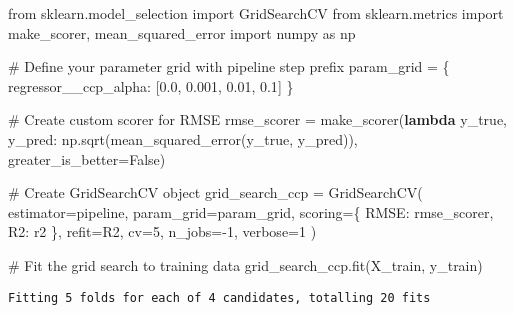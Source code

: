 \documentclass[
  letterpaper,
  DIV=11,
  numbers=noendperiod]{scrreprt}
\newenvironment{Shaded}{\begin{snugshade}}{\end{snugshade}}
\newcommand{\CommentTok}[1]{\textcolor[rgb]{0.37,0.37,0.37}{#1}}
\newcommand{\DecValTok}[1]{\textcolor[rgb]{0.68,0.00,0.00}{#1}}
\newcommand{\FloatTok}[1]{\textcolor[rgb]{0.68,0.00,0.00}{#1}}
\newcommand{\ImportTok}[1]{\textcolor[rgb]{0.00,0.46,0.62}{#1}}
\newcommand{\KeywordTok}[1]{\textcolor[rgb]{0.00,0.23,0.31}{\textbf{#1}}}
\newcommand{\NormalTok}[1]{\textcolor[rgb]{0.00,0.23,0.31}{#1}}
\newcommand{\OperatorTok}[1]{\textcolor[rgb]{0.37,0.37,0.37}{#1}}
\newcommand{\StringTok}[1]{\textcolor[rgb]{0.13,0.47,0.30}{#1}}
\newcommand{\VariableTok}[1]{\textcolor[rgb]{0.07,0.07,0.07}{#1}}
\begin{document}
\begin{Shaded}
\begin{Highlighting}[]
\ImportTok{from}\NormalTok{ sklearn.model\_selection }\ImportTok{import}\NormalTok{ GridSearchCV}
\ImportTok{from}\NormalTok{ sklearn.metrics }\ImportTok{import}\NormalTok{ make\_scorer, mean\_squared\_error}
\ImportTok{import}\NormalTok{ numpy }\ImportTok{as}\NormalTok{ np}

\CommentTok{\# Define your parameter grid with pipeline step prefix}
\NormalTok{param\_grid }\OperatorTok{=}\NormalTok{ \{}
    \StringTok{\textquotesingle{}regressor\_\_ccp\_alpha\textquotesingle{}}\NormalTok{: [}\FloatTok{0.0}\NormalTok{, }\FloatTok{0.001}\NormalTok{, }\FloatTok{0.01}\NormalTok{, }\FloatTok{0.1}\NormalTok{]}
\NormalTok{\}}

\CommentTok{\# Create custom scorer for RMSE}
\NormalTok{rmse\_scorer }\OperatorTok{=}\NormalTok{ make\_scorer(}\KeywordTok{lambda}\NormalTok{ y\_true, y\_pred: np.sqrt(mean\_squared\_error(y\_true, y\_pred)),}
\NormalTok{                          greater\_is\_better}\OperatorTok{=}\VariableTok{False}\NormalTok{)}

\CommentTok{\# Create GridSearchCV object}
\NormalTok{grid\_search\_ccp }\OperatorTok{=}\NormalTok{ GridSearchCV(}
\NormalTok{    estimator}\OperatorTok{=}\NormalTok{pipeline,}
\NormalTok{    param\_grid}\OperatorTok{=}\NormalTok{param\_grid,}
\NormalTok{    scoring}\OperatorTok{=}\NormalTok{\{}
        \StringTok{\textquotesingle{}RMSE\textquotesingle{}}\NormalTok{: rmse\_scorer,}
        \StringTok{\textquotesingle{}R2\textquotesingle{}}\NormalTok{: }\StringTok{\textquotesingle{}r2\textquotesingle{}}
\NormalTok{    \},}
\NormalTok{    refit}\OperatorTok{=}\StringTok{\textquotesingle{}R2\textquotesingle{}}\NormalTok{,}
\NormalTok{    cv}\OperatorTok{=}\DecValTok{5}\NormalTok{,}
\NormalTok{    n\_jobs}\OperatorTok{={-}}\DecValTok{1}\NormalTok{,}
\NormalTok{    verbose}\OperatorTok{=}\DecValTok{1}
\NormalTok{)}

\CommentTok{\# Fit the grid search to training data}
\NormalTok{grid\_search\_ccp.fit(X\_train, y\_train)}
\end{Highlighting}
\end{Shaded}

\begin{verbatim}
Fitting 5 folds for each of 4 candidates, totalling 20 fits
\end{verbatim}
\end{document}
